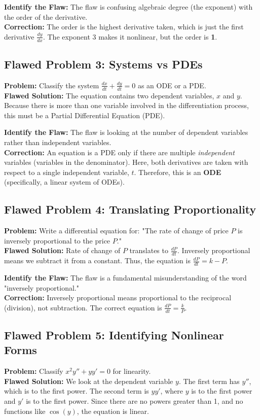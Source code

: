 \documentclass[11pt]{article}
\begin{document}
\textbf{Identify the Flaw:} The flaw is confusing algebraic degree (the exponent) with the order of the derivative. \\
\textbf{Correction:} The order is the highest derivative taken, which is just the first derivative $\frac{dy}{dx}$. The exponent $3$ makes it nonlinear, but the order is \textbf{1}.

\subsection*{Flawed Problem 3: Systems vs PDEs}
\textbf{Problem:} Classify the system $\frac{dx}{dt} + \frac{dy}{dt} = 0$ as an ODE or a PDE. \\
\textbf{Flawed Solution:} 
The equation contains two dependent variables, $x$ and $y$. Because there is more than one variable involved in the differentiation process, this must be a Partial Differential Equation (PDE).

\textbf{Identify the Flaw:} The flaw is looking at the number of dependent variables rather than independent variables. \\
\textbf{Correction:} An equation is a PDE only if there are multiple \textit{independent} variables (variables in the denominator). Here, both derivatives are taken with respect to a single independent variable, $t$. Therefore, this is an \textbf{ODE} (specifically, a linear system of ODEs).

\subsection*{Flawed Problem 4: Translating Proportionality}
\textbf{Problem:} Write a differential equation for: "The rate of change of price $P$ is inversely proportional to the price $P$." \\
\textbf{Flawed Solution:} 
Rate of change of $P$ translates to $\frac{dP}{dt}$. Inversely proportional means we subtract it from a constant. Thus, the equation is $\frac{dP}{dt} = k - P$.

\textbf{Identify the Flaw:} The flaw is a fundamental misunderstanding of the word "inversely proportional." \\
\textbf{Correction:} Inversely proportional means proportional to the reciprocal (division), not subtraction. The correct equation is $\frac{dP}{dt} = \frac{k}{P}$.

\subsection*{Flawed Problem 5: Identifying Nonlinear Forms}
\textbf{Problem:} Classify $x^2 y'' + y y' = 0$ for linearity. \\
\textbf{Flawed Solution:} 
We look at the dependent variable $y$. The first term has $y''$, which is to the first power. The second term is $y y'$, where $y$ is to the first power and $y'$ is to the first power. Since there are no powers greater than 1, and no functions like $\cos(y)$, the equation is linear.
\end{document}
